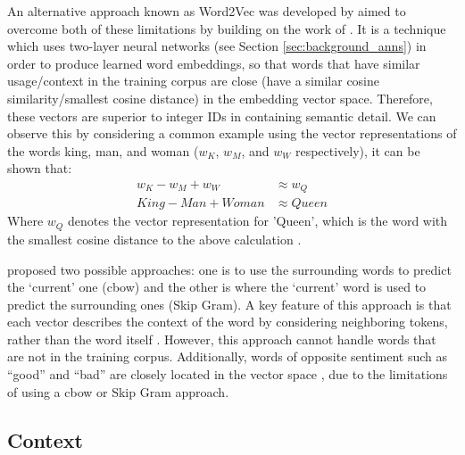An alternative approach known as Word2Vec was developed by \citet{mikolov2013efficient} aimed to overcome both of these limitations by building on the work of \citet{bengio2000neural}. It is a technique which uses two-layer neural networks (see Section \ref{sec:background_anns}) in order to produce learned word embeddings, so that words that have similar usage/context in the training corpus are close (have a similar cosine similarity/smallest cosine distance) in the embedding vector space. Therefore, these vectors are superior to integer IDs in containing semantic detail. We can observe this by considering a common example using the vector representations of the words king, man, and woman ($w_K$, $w_M$, and $w_W$ respectively), it can be shown that:
\begin{equation*}
    \begin{aligned}
        w_K - w_M + w_W &\approx w_Q \\
        King - Man + Woman &\approx Queen
    \end{aligned}
\end{equation*}
Where $w_Q$ denotes the vector representation for 'Queen', which is the word with the smallest cosine distance to the above calculation \citep{allen2019analogies}.

\cite{mikolov2013efficient} proposed two possible approaches: one is to use the surrounding words to predict the `current' one (\acrfull{cbow}) and the other is where the `current' word is used to predict the surrounding ones (Skip Gram). A key feature of this approach is that each vector describes the context of the word by considering neighboring tokens, rather than the word itself \citep{li2018introduction}. However, this approach cannot handle words that are not in the training corpus. Additionally, words of opposite sentiment such as “good” and “bad” are closely located in the vector space \citep{sivakumar2020review}, due to the limitations of using a \acrshort{cbow} or Skip Gram approach.


\subsection{Context}
\label{sec:embeddings_context}

